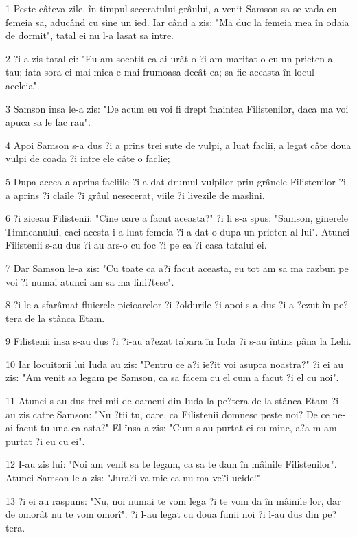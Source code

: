 \par 1 Peste câteva zile, în timpul seceratului grâului, a venit Samson sa se vada cu femeia sa, aducând cu sine un ied. Iar când a zis: "Ma duc la femeia mea în odaia de dormit", tatal ei nu l-a lasat sa intre.
\par 2 ?i a zis tatal ei: "Eu am socotit ca ai urât-o ?i am maritat-o cu un prieten al tau; iata sora ei mai mica e mai frumoasa decât ea; sa fie aceasta în locul aceleia".
\par 3 Samson însa le-a zis: "De acum eu voi fi drept înaintea Filistenilor, daca ma voi apuca sa le fac rau".
\par 4 Apoi Samson s-a dus ?i a prins trei sute de vulpi, a luat faclii, a legat câte doua vulpi de coada ?i intre ele câte o faclie;
\par 5 Dupa aceea a aprins facliile ?i a dat drumul vulpilor prin grânele Filistenilor ?i a aprins ?i claile ?i grâul nesecerat, viile ?i livezile de maslini.
\par 6 ?i ziceau Filistenii: "Cine oare a facut aceasta?" ?i li s-a spus: "Samson, ginerele Timneanului, caci acesta i-a luat femeia ?i a dat-o dupa un prieten al lui". Atunci Filistenii s-au dus ?i au ars-o cu foc ?i pe ea ?i casa tatalui ei.
\par 7 Dar Samson le-a zis: "Cu toate ca a?i facut aceasta, eu tot am sa ma razbun pe voi ?i numai atunci am sa ma lini?tesc".
\par 8 ?i le-a sfarâmat fluierele picioarelor ?i ?oldurile ?i apoi s-a dus ?i a ?ezut în pe?tera de la stânca Etam.
\par 9 Filistenii însa s-au dus ?i ?i-au a?ezat tabara în Iuda ?i s-au întins pâna la Lehi.
\par 10 Iar locuitorii lui Iuda au zis: "Pentru ce a?i ie?it voi asupra noastra?" ?i ei au zis: "Am venit sa legam pe Samson, ca sa facem cu el cum a facut ?i el cu noi".
\par 11 Atunci s-au dus trei mii de oameni din Iuda la pe?tera de la stânca Etam ?i au zis catre Samson: "Nu ?tii tu, oare, ca Filistenii domnesc peste noi? De ce ne-ai facut tu una ca asta?" El însa a zis: "Cum s-au purtat ei cu mine, a?a m-am purtat ?i eu cu ei".
\par 12 I-au zis lui: "Noi am venit sa te legam, ca sa te dam în mâinile Filistenilor". Atunci Samson le-a zis: "Jura?i-va mie ca nu ma ve?i ucide!"
\par 13 ?i ei au raspuns: "Nu, noi numai te vom lega ?i te vom da în mâinile lor, dar de omorât nu te vom omorî". ?i l-au legat cu doua funii noi ?i l-au dus din pe?tera.

